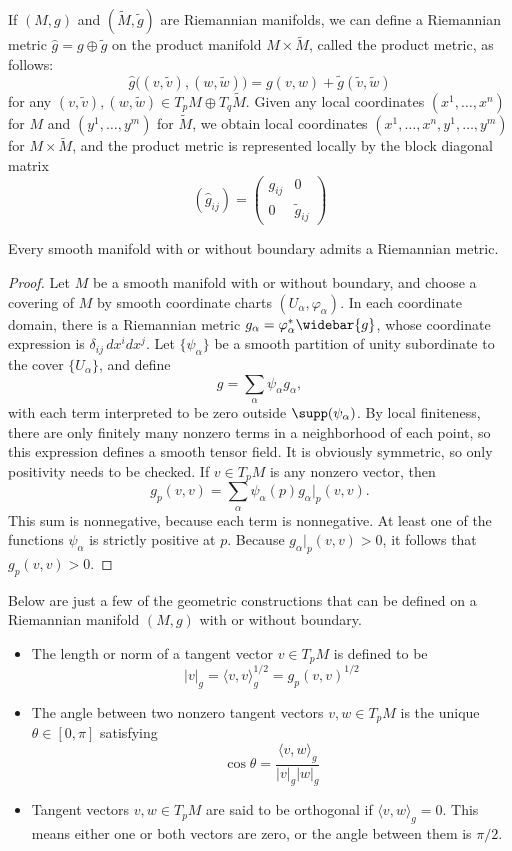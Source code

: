 \begin{example}
If $(M,g)$ and $(\widetilde{M},\widetilde{g})$ are Riemannian manifolds, we can define a Riemannian metric $\widehat{g}=g\oplus\widetilde{g}$ on the product manifold $M\times\widetilde{M}$, called the product metric, as follows:
\[\widehat{g}\big((v,\widetilde{v}),(w,\widetilde{w})\big)=g(v,w)+\widetilde{g}(\widetilde{v},\widetilde{w})\]
for any $(v,\widetilde{v}),(w,\widetilde{w})\in T_pM\oplus T_q\widetilde{M}$. Given any local coordinates $(x^1,\dots,x^n)$ for $M$ and $(y^1,\dots,y^m)$ for $\widetilde{M}$, we obtain local coordinates $(x^1,\dots,x^n,y^1,\dots,y^m)$ for $M\times\widetilde{M}$, and the product metric is represented locally by the block diagonal matrix
\[(\widehat{g}_{ij})=\begin{pmatrix}
g_{ij}&0\\
0&\widetilde{g}_{ij}
\end{pmatrix}\]
\end{example}
\begin{proposition}
Every smooth manifold with or without boundary admits a Riemannian metric.
\end{proposition}
\begin{proof}
Let $M$ be a smooth manifold with or without boundary, and choose a covering of $M$ by smooth coordinate charts $(U_\alpha,\varphi_\alpha)$. In each coordinate domain, there
is a Riemannian metric $g_\alpha=\varphi_\alpha^*\widebar{g}$, whose coordinate expression is $\delta_{ij}\,dx^idx^j$. Let $\{\psi_\alpha\}$ be a smooth partition of unity subordinate to the cover $\{U_\alpha\}$, and define
\[g=\sum_\alpha\psi_\alpha g_\alpha,\]
with each term interpreted to be zero outside $\supp(\psi_\alpha)$. By local finiteness, there are only finitely many nonzero terms in a neighborhood of each point, so this expression defines a smooth tensor field. It is obviously symmetric, so only positivity needs to be checked. If $v\in T_pM$ is any nonzero vector, then
\[g_p(v,v)=\sum_\alpha\psi_\alpha(p)g_\alpha|_p(v,v).\]
This sum is nonnegative, because each term is nonnegative. At least one of the functions
$\psi_\alpha$ is strictly positive at $p$. Because $g_\alpha|_p(v,v)>0$, it follows that $g_p(v,v)>0$.
\end{proof}
Below are just a few of the geometric constructions that can be defined on a Riemannian manifold $(M,g)$ with or without boundary.
\begin{itemize}
\item The length or norm of a tangent vector $v\in T_pM$ is defined to be
\[|v|_g=\langle v,v\rangle_g^{1/2}=g_p(v,v)^{1/2}\]
\item The angle between two nonzero tangent vectors $v,w\in T_pM$ is the unique  $\theta\in[0,\pi]$ satisfying
\[\cos\theta=\frac{\langle v,w\rangle_g}{|v|_g|w|_g}\]
\item Tangent vectors $v,w\in T_pM$ are said to be orthogonal if $\langle v,w\rangle_g=0$. This means either one or both vectors are zero, or the angle between them is $\pi/2$.
\end{itemize}
